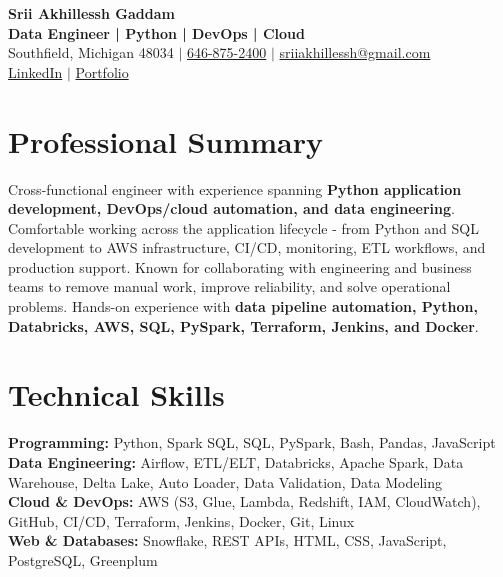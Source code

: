 \documentclass[letterpaper,10pt]{article}
\begin{document}
\fontsize{9.35pt}{10.45pt}\selectfont

\begin{center}
    {\LARGE \textbf{Srii Akhillessh Gaddam}} \\[-1pt]
    \textbf{Data Engineer | Python | DevOps | Cloud} \\[2pt]
    Southfield, Michigan 48034 $|$
    \href{tel:6468752400}{646-875-2400} $|$
    \href{mailto:sriiakhillessh@gmail.com}{sriiakhillessh@gmail.com} \\[1pt]
    \href{https://www.linkedin.com/in/srii-akhiilessh-gaddam-b48668191/}{LinkedIn} $|$
    \href{https://sriiakhillesshg.github.io/portfolio/}{Portfolio}
\end{center}
\vspace{-8pt}

\section{Professional Summary}
\small{Cross-functional engineer with experience spanning \textbf{Python application development, DevOps/cloud automation, and data engineering}. Comfortable working across the application lifecycle - from Python and SQL development to AWS infrastructure, CI/CD, monitoring, ETL workflows, and production support. Known for collaborating with engineering and business teams to remove manual work, improve reliability, and solve operational problems. Hands-on experience with \textbf{data pipeline automation, Python, Databricks, AWS, SQL, PySpark, Terraform, Jenkins, and Docker}.}

\section{Technical Skills}
\small{
\textbf{Programming:} Python, Spark SQL, SQL, PySpark, Bash, Pandas, JavaScript \\
\textbf{Data Engineering:} Airflow, ETL/ELT, Databricks, Apache Spark, Data Warehouse, Delta Lake, Auto Loader, Data Validation, Data Modeling \\
\textbf{Cloud \& DevOps:} AWS (S3, Glue, Lambda, Redshift, IAM, CloudWatch), GitHub, CI/CD, Terraform, Jenkins, Docker, Git, Linux \\
\textbf{Web \& Databases:} Snowflake, REST APIs, HTML, CSS, JavaScript, PostgreSQL, Greenplum
}
\end{document}

